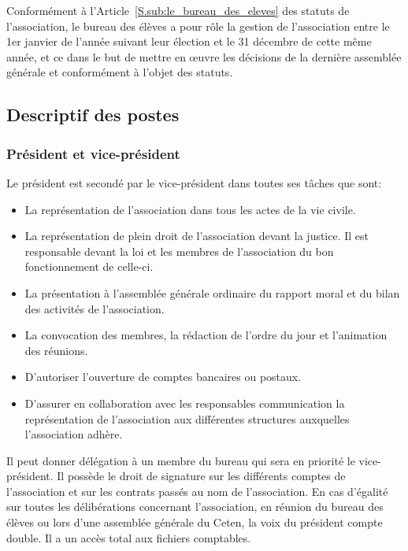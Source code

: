 \documentclass{article} %
\begin{document}
			Conformément à l’Article~\ref{S.sub:le_bureau_des_eleves} des
			statuts de l’association, le bureau des élèves a pour rôle la
			gestion de l'association entre le 1er janvier de l’année suivant
			leur élection et le 31 décembre de cette même année, et ce dans le
			but de mettre en œuvre les décisions de la dernière assemblée
			générale et conformément à l'objet des statuts.

		\subsection{Descriptif des postes}
\label{sub:descriptif_des_postes}

			\subsubsection{Président et vice-président}
\label{ssub:president_et_vice_president}

				Le président est secondé par le vice-président dans toutes ses
				tâches que sont:
				\begin{itemize}
					\item La représentation de l’association dans tous les actes
						de la vie civile.
					\item La représentation de plein droit de l’association
						devant la justice. Il est responsable devant la loi et
						les membres de l’association du bon fonctionnement de
						celle-ci.
					\item La présentation à l’assemblée générale
						ordinaire du rapport moral et du bilan des activités de
						l’association.
					\item La convocation des membres, la rédaction de l’ordre du
						jour et l’animation des réunions.
					\item D’autoriser l’ouverture de comptes bancaires ou
						postaux.
					\item D’assurer en collaboration avec les responsables
						communication la représentation de l’association aux
						différentes structures auxquelles l’association adhère. 
				\end{itemize}

				Il peut donner délégation à un membre du bureau qui sera en
				priorité le vice-président. Il possède le droit de signature sur
				les différents comptes de l'association et sur les contrats
				passés au nom de l’association. En cas d’égalité sur toutes les
				délibérations concernant l’association, en réunion du bureau des
				élèves ou lors d’une assemblée générale du Ceten, la voix du
				président compte double. Il a un accès total aux fichiers
				comptables.
\end{document}
